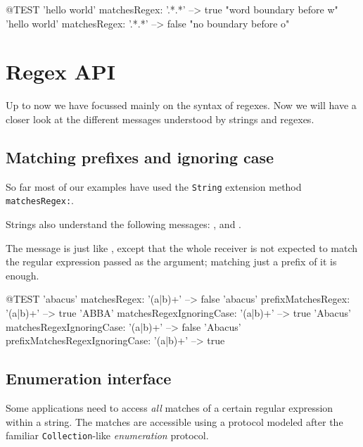 \documentclass[10pt,twoside,chapterprefix=false]{scrbook}
\newcommand{\NewTermAlt}[2]{%
	\emph{#1}\marginnote{\emph{#2}}}
\renewcommand{\ct}{\lstinline[mathescape=false,basicstyle={\sffamily\upshape}]}
\begin{document}
{\begin{ToSh-code}{@TEST}
'hello world' matchesRegex: '.*\bw.*' --> true      "word boundary before w"
'hello world' matchesRegex: '.*\bo.*'  --> false    "no boundary before o"
\end{ToSh-code}

\section{Regex API}

Up to now we have focussed mainly on the syntax of regexes.  Now we will have a closer look at the different messages understood by strings and regexes.

\subsection{Matching prefixes and ignoring case}

So far most of our examples have used the \ct{String} extension method \ct{matchesRegex:}.

Strings also understand the following messages:
,  and
.

The message  is just like , except that the whole receiver is not expected to match the regular expression passed as the argument; matching just a prefix of it is enough.
\begin{ToSh-code}{@TEST}
'abacus' matchesRegex: '(a|b)+'                                --> false
'abacus' prefixMatchesRegex: '(a|b)+'                       --> true
'ABBA' matchesRegexIgnoringCase: '(a|b)+'            --> true
'Abacus' matchesRegexIgnoringCase: '(a|b)+'          --> false
'Abacus' prefixMatchesRegexIgnoringCase: '(a|b)+' --> true
\end{ToSh-code}

\subsection{Enumeration interface}

Some applications need to access \emph{all} matches of a certain regular
expression within a string.  The matches are accessible using a protocol
modeled after the familiar \ct{Collection}-like
\NewTermAlt{enumeration}{match enumeration} protocol.

}
\end{document}
